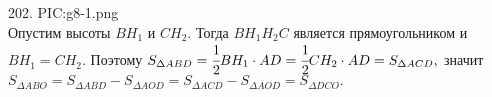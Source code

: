 202. {{PIC:g8-1.png}}\\
Опустим высоты $BH_1$ и $CH_2.$ Тогда $BH_1H_2C$ является прямоугольником и $BH_1=CH_2.$ Поэтому $S_{\Delta ABD}=\cfrac{1}{2}BH_1\cdot AD=\cfrac{1}{2}CH_2\cdot AD=S_{\Delta ACD},$ значит $S_{\Delta ABO}=S_{\Delta ABD}-S_{\Delta AOD}=S_{\Delta ACD}-S_{\Delta AOD}=S_{\Delta DCO}.$\\
